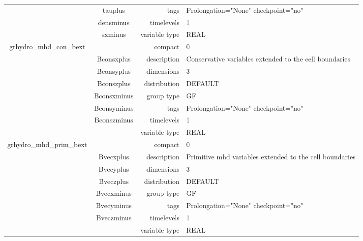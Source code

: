\documentclass{article}
\begin{document}
\begin{tabular*}{150mm}{|c|c@{\extracolsep{\fill}}|rl|}
 & tauplus & tags & Prolongation="None" checkpoint="no" \\ 
 & densminus & timelevels & 1 \\ 
 & sxminus & variable type & REAL \\ 
\hline 
grhydro\_mhd\_con\_bext &  & compact & 0 \\ 
 & Bconsxplus & description & Conservative variables extended to the cell boundaries \\ 
 & Bconsyplus & dimensions & 3 \\ 
 & Bconszplus & distribution & DEFAULT \\ 
 & Bconsxminus & group type & GF \\ 
 & Bconsyminus & tags & Prolongation="None" checkpoint="no" \\ 
 & Bconszminus & timelevels & 1 \\ 
 &  & variable type & REAL \\ 
\hline 
grhydro\_mhd\_prim\_bext &  & compact & 0 \\ 
 & Bvecxplus & description & Primitive mhd variables extended to the cell boundaries \\ 
 & Bvecyplus & dimensions & 3 \\ 
 & Bveczplus & distribution & DEFAULT \\ 
 & Bvecxminus & group type & GF \\ 
 & Bvecyminus & tags & Prolongation="None" checkpoint="no" \\ 
 & Bveczminus & timelevels & 1 \\ 
 &  & variable type & REAL \\ 
\hline 
\end{tabular*} 



\vspace{5mm}
\vspace{5mm}
\end{document}
